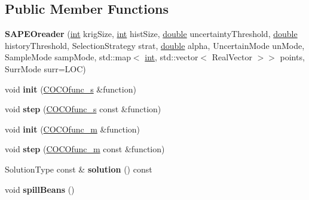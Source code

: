 \subsection*{Public Member Functions}
\begin{DoxyCompactItemize}
\item 
{\bfseries S\+A\+P\+E\+Oreader} (\hyperlink{classint}{int} krig\+Size, \hyperlink{classint}{int} hist\+Size, \hyperlink{classdouble}{double} uncertainty\+Threshold, \hyperlink{classdouble}{double} history\+Threshold, Selection\+Strategy strat, \hyperlink{classdouble}{double} alpha, Uncertain\+Mode un\+Mode, Sample\+Mode samp\+Mode, std\+::map$<$ \hyperlink{classint}{int}, std\+::vector$<$ Real\+Vector $>$$>$ points, Surr\+Mode surr=L\+OC)\hypertarget{classSAPEOreader_a8ce0ed13e2c4df222c7a9eef0b82b731}{}\label{classSAPEOreader_a8ce0ed13e2c4df222c7a9eef0b82b731}

\item 
void {\bfseries init} (\hyperlink{classCOCOfunc__s}{C\+O\+C\+Ofunc\+\_\+s} \&function)\hypertarget{classSAPEOreader_ac651679bf1e16c34568dd59265e78e86}{}\label{classSAPEOreader_ac651679bf1e16c34568dd59265e78e86}

\item 
void {\bfseries step} (\hyperlink{classCOCOfunc__s}{C\+O\+C\+Ofunc\+\_\+s} const \&function)\hypertarget{classSAPEOreader_a625731c7c3604b3a69adf0fd904d149e}{}\label{classSAPEOreader_a625731c7c3604b3a69adf0fd904d149e}

\item 
void {\bfseries init} (\hyperlink{classCOCOfunc__m}{C\+O\+C\+Ofunc\+\_\+m} \&function)\hypertarget{classSAPEOreader_a129d7a867d08675fb581f109e2bc5a8e}{}\label{classSAPEOreader_a129d7a867d08675fb581f109e2bc5a8e}

\item 
void {\bfseries step} (\hyperlink{classCOCOfunc__m}{C\+O\+C\+Ofunc\+\_\+m} const \&function)\hypertarget{classSAPEOreader_a991bec4d9b37559cff189f995aa4042c}{}\label{classSAPEOreader_a991bec4d9b37559cff189f995aa4042c}

\item 
Solution\+Type const \& {\bfseries solution} () const \hypertarget{classSAPEOreader_a1ddf68afdae56ba839a65b2faab9dbc2}{}\label{classSAPEOreader_a1ddf68afdae56ba839a65b2faab9dbc2}

\item 
void {\bfseries spill\+Beans} ()\hypertarget{classSAPEOreader_ad3b1388bf411b1ca6414b27beecfb8d3}{}\label{classSAPEOreader_ad3b1388bf411b1ca6414b27beecfb8d3}


\end{DoxyCompactItemize}
